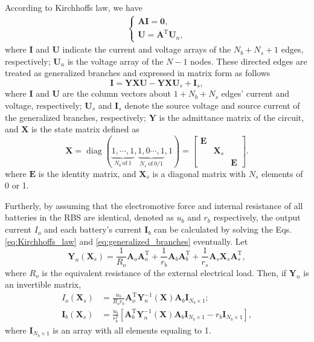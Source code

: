\documentclass{article}
\DeclareMathOperator{\diag}{diag}
\def\T{\mathrm{T}}
\begin{document}
According to Kirchhoffs law, we have
\begin{align}\label{eq:Kirchhoffs_law}
    \begin{cases}
        \bm{A} \bm{I} = \bm{0}, \\
        \bm{U}        = \bm{A}^\T \bm{U}_n,
    \end{cases}
\end{align}
where $\bm{I}$ and $\bm{U}$ indicate the current and voltage arrays of the $N_b+N_s+1$ edges, respectively;
$\bm{U}_n$ is the voltage array of the $N-1$ nodes.
These directed edges are treated as generalized branches and expressed in matrix form as follows
\begin{equation}\label{eq:generalized_branches}
    \bm{I} = \bm{Y}\bm{X} \bm{U} - \bm{Y}\bm{X} \bm{U}_s +\bm{I}_s,
\end{equation}
where $\bm{I}$ and $\bm{U}$ are the column vectors about $1+N_b+N_s$ edges' current and voltage, respectively;
$\bm{U}_s$ and $\bm{I}_s$ denote the source voltage and source current of the generalized branches, respectively;
$\bm{Y}$ is the admittance matrix of the circuit, and $\bm{X}$ is the state matrix defined as
\begin{equation}\label{eq:X}
    \bm{X} = \diag(
    \underbrace{1, \cdots, 1}_{N_b~\text{of}~1},
    \underbrace{1, 0 \cdots, 1}_{N_s~\text{of}~0/1},
    1)
    =\begin{bmatrix}
        \bm{E} & & \\
        & \bm{X}_s &\\
        & &\bm{E}
    \end{bmatrix}.
\end{equation}
where $\bm{E}$ is the identity matrix, and $\bm{X}_s$ is a diagonal matrix with $N_s$ elements of 0 or 1.


Furtherly, by assuming that the electromotive force and internal resistance of all batteries in the RBS are identical, denoted as $u_b$ and $r_b$ respectively, the output current $I_o$ and each battery's current $\bm{I}_b$ can be calculated by solving the Eqs. \ref{eq:Kirchhoffs_law} and \ref{eq:generalized_branches} eventually.
Let
\begin{equation}\label{eq:Yn}
    \bm{Y}_n (\bm{X}_s) = \frac{1}{R_o} \bm{A}_o\bm{A}_o^\T + \frac{1}{r_b} \bm{A}_b\bm{A}_b^\T + \frac{1}{r_s}\bm{A}_s\bm{X}_s\bm{A}_s^\T,
\end{equation}
where $R_o$ is the equivalent resistance of the external electrical load.
Then, if $\bm{Y}_n$ is an invertible matrix,
\begin{align} %
    I_o(\bm{X}_s)      & = \frac{u_b}{R_o r_b} \bm{A}_o^\T \bm{Y}_n^{-1}(\bm{X}) \bm{A}_b \bm{I}_{N_b\times 1};\label{eq:I_o}\\
    \bm{I}_b(\bm{X}_s) & = \frac{u_b}{r_b^2}[\bm{A}_b^\T \bm{Y}_n^{-1}(\bm{X}) \bm{A}_b\bm{I}_{N_b \times 1}  -r_b \bm{I}_{N_b \times 1}],\label{eq:I_b}
\end{align}
where $\bm{I}_{N_b\times 1}$ is an array with all elements equaling to 1.
\end{document}
